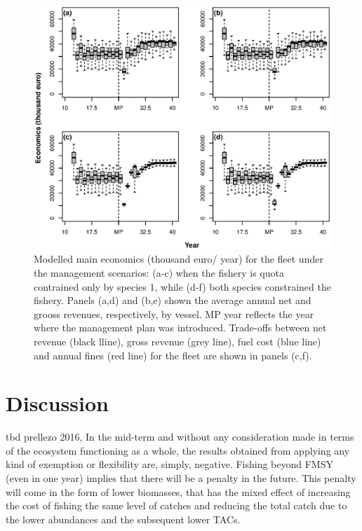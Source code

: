 \documentclass[12pt,oneline,a4paper,numbib]{ouparticle}
\numberwithin{equation}{subsection} %
\begin{document}
\begin{figure}[!ht]
\centering
\includegraphics[width=\textwidth]{Figures/Mean_Economics.eps} 
\caption{Modelled main economics (thousand euro/ year) for the fleet under the management scenarios: (a-c) when the fishery is quota contrained only by species 1, while (d-f) both species constrained the fishery. Panels (a,d) and (b,e) shown the average annual net and grooss revenues, respectively, by vessel. MP year reflects the year where the management plan was introduced. Trade-offs between net revenue (black lline), gross revenue (grey line), fuel cost (blue line) and annual fines (red line) for the fleet are shown in panels (c,f).}
\label{f:meanecon}
\end{figure}

\clearpage

\section{Discussion}

tbd
prellezo 2016, In the mid-term and without any consideration made in terms of the ecosystem functioning as a whole, the results obtained from applying any kind of exemption or flexibility are, simply, negative. Fishing beyond FMSY (even in one year) implies that there will be a penalty in the future. This penalty will come in the form of lower biomasses, that has the mixed effect of increasing the cost of fishing the same level of catches and reducing the total catch due to the lower abundances and the subsequent lower TACs.
\end{document}

